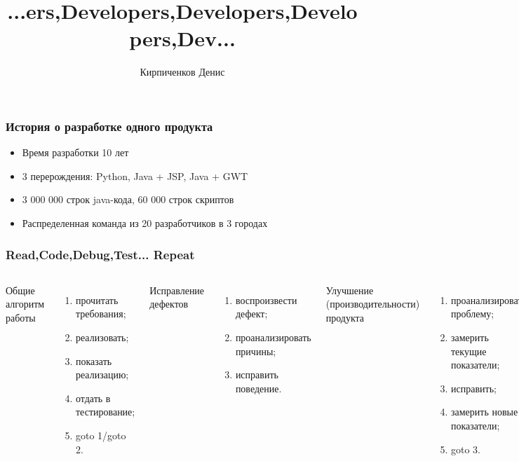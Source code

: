 \documentclass[10pt,pdf,hyperref={unicode}]{beamer}
\date{}
\title[]{...ers,Developers,Developers,Developers,Dev...}
\author[]{Кирпиченков Денис}
\institute[]{Naumen}
\begin{document}
\begin{frame}
\titlepage
\end{frame} 

\begin{frame}
\frametitle{История о разработке одного продукта} 

\begin{itemize}
\item Время разработки 10 лет
\item 3 перерождения: Python, Java + JSP, Java + GWT
\item 3 000 000 строк java-кода, 60 000 строк скриптов
\item Распределенная команда из 20 разработчиков в 3 городах
\end{itemize}

\end{frame}

\begin{frame}
\frametitle{Read,Code,Debug,Test... Repeat} 

\begin{columns}[T]
		\center
			Общие алгоритм работы
		\begin{enumerate}

			\item прочитать требования;
			\item реализовать;
			\item показать реализацию;
			\item отдать в тестирование;
			\item goto 1/goto 2.
	
		\end{enumerate}
		\center
			Исправление дефектов
		\begin{enumerate}
			\item воспроизвести дефект;
			\item проанализировать причины;
			\item исправить поведение.
		\end{enumerate}
		\center
			Улучшение (производительности) продукта
		\begin{enumerate}
			\item проанализировать проблему;
			\item замерить текущие показатели;
			\item исправить;
			\item замерить новые показатели;
			\item goto 3.
		\end{enumerate}
	\end{columns}
\end{frame}
\end{document}

